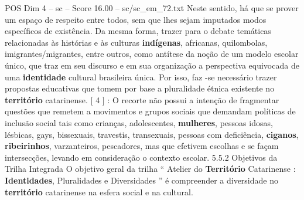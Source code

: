 \begin{textsample}{POS Dim 4 – sc – Score 16.00 – sc/sc\_em\_72.txt}
Neste sentido, há que se prover um espaço de respeito entre todos, sem que lhes sejam imputados modos específicos de existência.
Da mesma forma, trazer para o debate temáticas relacionadas às histórias e às culturas \textbf{indígenas}, africanas, quilombolas, imigrantes/migrantes, entre outros, como antítese da noção de um modelo escolar único, que traz em seu discurso e em sua organização a perspectiva equivocada de uma \textbf{identidade} cultural brasileira única.
Por isso, faz -se necessário trazer propostas educativas que tomem por base a pluralidade étnica existente no \textbf{território} catarinense. [ 4 ] : O recorte não possui a intenção de fragmentar questões que remetem a movimentos e grupos sociais que demandam políticas de inclusão social tais como crianças, adolescentes, \textbf{mulheres}, pessoas idosas, lésbicas, gays, bissexuais, travestis, transexuais, pessoas com deficiência, \textbf{ciganos}, \textbf{ribeirinhos}, varzanteiros, pescadores, mas que efetivem escolhas e se façam intersecções, levando em consideração o contexto escolar. 5.5.2 Objetivos da Trilha Integrada O objetivo geral da trilha “ Atelier do \textbf{Território} Catarinense : \textbf{Identidades}, Pluralidades e Diversidades ” é compreender a diversidade no \textbf{território} catarinense na esfera social e na cultural.

\end{textsample}
